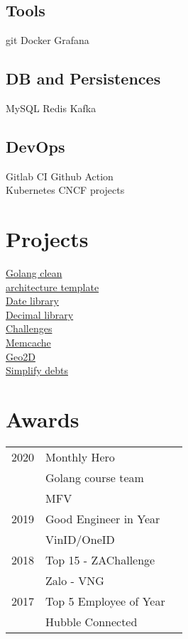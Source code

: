 \documentclass[]{deedy-resume-openfont}
\begin{document}
\begin{minipage}[t]{0.3\textwidth}
\subsection{Tools}
git \textbullet{}  Docker \textbullet{} Grafana
\sectionsep
\subsection{DB and Persistences}
MySQL \textbullet{}  Redis \textbullet{} Kafka
\sectionsep
\subsection{DevOps}
Gitlab CI \textbullet{} Github Action \textbullet{} \\
Kubernetes \textbullet{} CNCF projects
\sectionsep


\section{Projects}
\textbullet{} \href{https://github.com/lovung/GoCleanArchitecture}{ Golang clean \\ architecture template } \\
\textbullet{} \href{https://github.com/lovung/date}{ Date library } \\
\textbullet{} \href{https://github.com/lovung/decimal}{ Decimal library } \\
\textbullet{} \href{https://github.com/lovung/challenges}{ Challenges } \\
\textbullet{} \href{https://github.com/lovung/memcache}{ Memcache } \\
\textbullet{} \href{https://github.com/lovung/geo}{ Geo2D } \\
\textbullet{} \href{https://github.com/lovung/simplify-debts-demo}{ Simplify debts } \\


\section{Awards} 
\begin{tabular}{rll}
2020 &  Monthly Hero \\ & Golang course team \\ & MFV \\
2019 & Good Engineer in Year \\ & VinID/OneID \\
2018 & Top 15 - ZAChallenge  \\ & Zalo - VNG \\
2017 & Top 5 Employee of Year \\ & Hubble Connected \\
\end{tabular}
\sectionsep

%
%

\end{minipage} 
\end{document}
